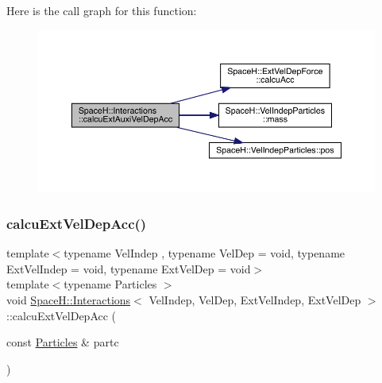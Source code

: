 Here is the call graph for this function\+:
\nopagebreak
\begin{figure}[H]
\begin{center}
\leavevmode
\includegraphics[width=350pt]{class_space_h_1_1_interactions_aaebe1aae63825dea150b3892e487da02_cgraph}
\end{center}
\end{figure}
\mbox{\label{class_space_h_1_1_interactions_a4d2c97809af5989a1a47def9e2fb0f35}} 
\subsubsection{\texorpdfstring{calcu\+Ext\+Vel\+Dep\+Acc()}{calcuExtVelDepAcc()}}
{\footnotesize\ttfamily template$<$typename Vel\+Indep , typename Vel\+Dep  = void, typename Ext\+Vel\+Indep  = void, typename Ext\+Vel\+Dep  = void$>$ \\
template$<$typename Particles $>$ \\
void \mbox{\hyperlink{class_space_h_1_1_interactions}{Space\+H\+::\+Interactions}}$<$ Vel\+Indep, Vel\+Dep, Ext\+Vel\+Indep, Ext\+Vel\+Dep $>$\+::calcu\+Ext\+Vel\+Dep\+Acc (\begin{DoxyParamCaption}\item[{const \mbox{\hyperlink{struct_space_h_1_1_particles}{Particles}} \&}]{partc }\end{DoxyParamCaption})\hspace{0.3cm}{\ttfamily [inline]}}

